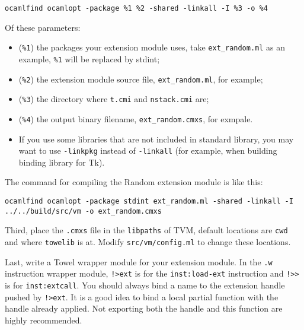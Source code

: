 \documentclass{article}
\newcommand{\inst}[1] {\texttt{inst:#1}}
\begin{document}
\texttt{ocamlfind ocamlopt -package \%1 \%2 -shared -linkall -I \%3 -o \%4}
\newline

Of these parameters:
\begin{itemize}
\item (\texttt{\%1}) the packages your extension module uses, take \texttt{ext\_random.ml} as an example, \texttt{\%1} will be replaced by stdint;
\item (\texttt{\%2}) the extension module source file, \texttt{ext\_random.ml}, for example;
\item (\texttt{\%3}) the directory where \texttt{t.cmi} and \texttt{nstack.cmi} are;
\item (\texttt{\%4}) the output binary filename, \texttt{ext\_random.cmxs}, for exmpale.
\item If you use some libraries that are not included in standard library, you may want to use \texttt{-linkpkg} instead of \texttt{-linkall} (for example, when building binding library for Tk).
\end{itemize}

The command for compiling the Random extension module is like this:\newline

\texttt{ocamlfind ocamlopt -package stdint ext\_random.ml -shared -linkall -I ../../build/src/vm -o ext\_random.cmxs}
\newline

Third, place the \texttt{.cmxs} file in the \texttt{libpaths} of TVM, default locations are \texttt{cwd} and where \texttt{towelib} is at. Modify \texttt{src/vm/config.ml} to change these locations.

Last, write a Towel wrapper module for your extension module. In the \texttt{.w} instruction wrapper module, \texttt{!>ext} is for the \inst{load-ext} instruction and \texttt{!>>} is for \inst{extcall}. You should always bind a name to the extension handle pushed by \texttt{!>ext}. It is a good idea to bind a local partial function with the handle already applied. Not exporting both the handle and this function are highly recommended.
\end{document}
